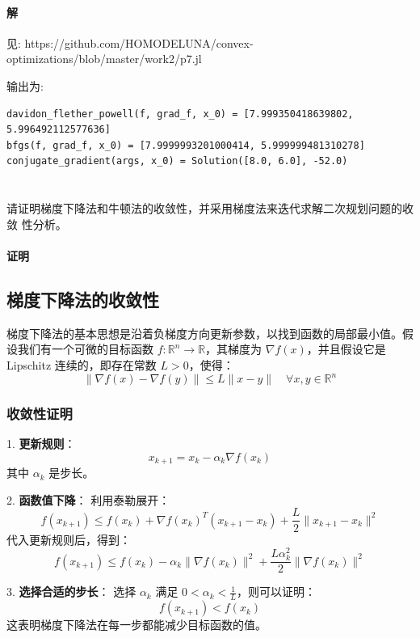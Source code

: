 \documentclass[a4paper]{article}
\begin{document}
\paragraph{解}

见: https://github.com/HOMODELUNA/convex-optimizations/blob/master/work2/p7.jl

输出为:
\begin{lstlisting}
davidon_flether_powell(f, grad_f, x_0) = [7.999350418639802, 5.996492112577636]
bfgs(f, grad_f, x_0) = [7.9999993201000414, 5.999999481310278]
conjugate_gradient(args, x_0) = Solution([8.0, 6.0], -52.0)
\end{lstlisting}

\section{}
请证明梯度下降法和牛顿法的收敛性，并采用梯度法来迭代求解二次规划问题的收敛
性分析。

\paragraph{证明}

\subsection{梯度下降法的收敛性}

梯度下降法的基本思想是沿着负梯度方向更新参数，以找到函数的局部最小值。假设我们有一个可微的目标函数 $f: \mathbb{R}^n \to \mathbb{R}$，其梯度为 $\nabla f(x)$，并且假设它是 Lipschitz 连续的，即存在常数 $L > 0$，使得：
\[
\|\nabla f(x) - \nabla f(y)\| \leq L \|x - y\| \quad \forall x, y \in \mathbb{R}^n
\]

\subsubsection{收敛性证明}

1. \textbf{更新规则}：
   \[
   x_{k+1} = x_k - \alpha_k \nabla f(x_k)
   \]
   其中 $\alpha_k$ 是步长。

2. \textbf{函数值下降}：
   利用泰勒展开：
   \[
   f(x_{k+1}) \leq f(x_k) + \nabla f(x_k)^T (x_{k+1} - x_k) + \frac{L}{2} \|x_{k+1} - x_k\|^2
   \]
   代入更新规则后，得到：
   \[
   f(x_{k+1}) \leq f(x_k) - \alpha_k \|\nabla f(x_k)\|^2 + \frac{L \alpha_k^2}{2} \|\nabla f(x_k)\|^2
   \]

3. \textbf{选择合适的步长}：
   选择 $\alpha_k$ 满足 $0 < \alpha_k < \frac{1}{L}$，则可以证明：
   \[
   f(x_{k+1}) < f(x_k)
   \]
   这表明梯度下降法在每一步都能减少目标函数的值。
\end{document}
